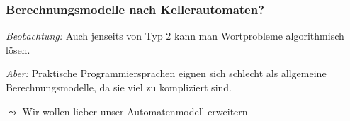 \documentclass[aspectratio=1610,onlymath]{beamer}
\begin{document}
\begin{frame}

\end{frame}

\begin{frame}\frametitle{Berechnungsmodelle nach Kellerautomaten?}

\emph{Beobachtung:} Auch jenseits von Typ 2 kann man Wortprobleme algorithmisch lösen.
\medskip

\pause

\emph{Aber:} Praktische Programmiersprachen eignen sich schlecht als allgemeine Berechnungsmodelle, da sie viel zu kompliziert sind.\bigskip

$\leadsto$ Wir wollen lieber unser Automatenmodell erweitern

\end{frame}
\end{document}
